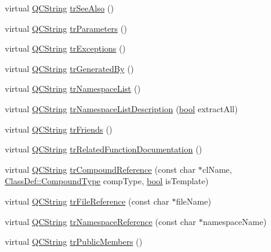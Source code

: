 \begin{DoxyCompactItemize}
virtual \hyperlink{class_q_c_string}{Q\+C\+String} \hyperlink{class_translator_greek_a37a05671b56d7f57078890b9958bbdbe}{tr\+See\+Also} ()
\item 
virtual \hyperlink{class_q_c_string}{Q\+C\+String} \hyperlink{class_translator_greek_a650335006e8ec633636e2348ead4e47a}{tr\+Parameters} ()
\item 
virtual \hyperlink{class_q_c_string}{Q\+C\+String} \hyperlink{class_translator_greek_a5eef51c517972bf9585fb4b6cbd6998f}{tr\+Exceptions} ()
\item 
virtual \hyperlink{class_q_c_string}{Q\+C\+String} \hyperlink{class_translator_greek_a97490b40f9a93f24b17ba9f6957e33d5}{tr\+Generated\+By} ()
\item 
virtual \hyperlink{class_q_c_string}{Q\+C\+String} \hyperlink{class_translator_greek_ae1333c6af679d9ec5bae803e5d425ba7}{tr\+Namespace\+List} ()
\item 
virtual \hyperlink{class_q_c_string}{Q\+C\+String} \hyperlink{class_translator_greek_a710f99f08eb348480ec387e6d0711b28}{tr\+Namespace\+List\+Description} (\hyperlink{qglobal_8h_a1062901a7428fdd9c7f180f5e01ea056}{bool} extract\+All)
\item 
virtual \hyperlink{class_q_c_string}{Q\+C\+String} \hyperlink{class_translator_greek_af3fe53c50bd85e7c18823547b25af4d7}{tr\+Friends} ()
\item 
virtual \hyperlink{class_q_c_string}{Q\+C\+String} \hyperlink{class_translator_greek_a6e90d9667c4cf90aa0f8022f2ec74b83}{tr\+Related\+Function\+Documentation} ()
\item 
virtual \hyperlink{class_q_c_string}{Q\+C\+String} \hyperlink{class_translator_greek_a170612fad7df5d18938666d06aff485c}{tr\+Compound\+Reference} (const char $\ast$cl\+Name, \hyperlink{class_class_def_ae70cf86d35fe954a94c566fbcfc87939}{Class\+Def\+::\+Compound\+Type} comp\+Type, \hyperlink{qglobal_8h_a1062901a7428fdd9c7f180f5e01ea056}{bool} is\+Template)
\item 
virtual \hyperlink{class_q_c_string}{Q\+C\+String} \hyperlink{class_translator_greek_ab6de6a61c25117b7a42176c9f53621d2}{tr\+File\+Reference} (const char $\ast$file\+Name)
\item 
virtual \hyperlink{class_q_c_string}{Q\+C\+String} \hyperlink{class_translator_greek_afbb0c25e8751adf20dc95f9cb181dce6}{tr\+Namespace\+Reference} (const char $\ast$namespace\+Name)
\item 
virtual \hyperlink{class_q_c_string}{Q\+C\+String} \hyperlink{class_translator_greek_af9f36d6769dc9d255aa2687f358c0b92}{tr\+Public\+Members} ()

\end{DoxyCompactItemize}
